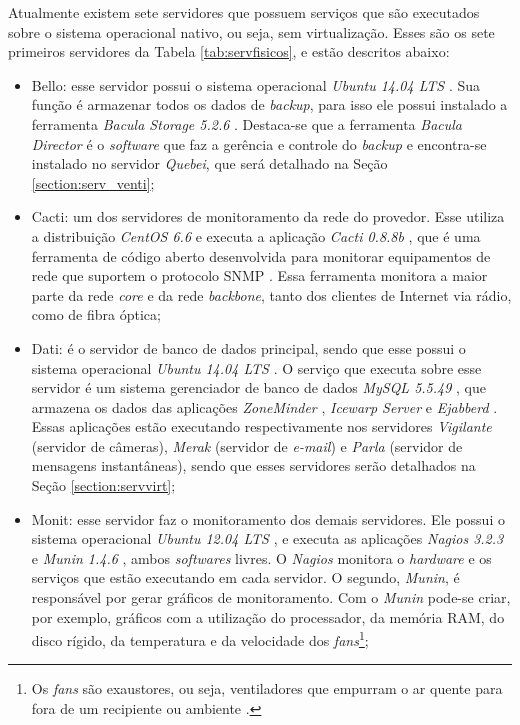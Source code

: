 Atualmente existem sete servidores que possuem serviços que são executados sobre o sistema operacional nativo, ou seja, sem virtualização. 
Esses são os sete primeiros servidores da Tabela \ref{tab:servfisicos}, e estão descritos abaixo:
\begin{itemize}
 \item Bello: esse servidor possui o sistema operacional \textit{Ubuntu 14.04 \ac{LTS}} \cite{ubuntu}. Sua função é armazenar todos os 
 dados de \textit{backup}, para isso ele possui instalado a ferramenta \textit{Bacula Storage 5.2.6} \cite{bacula}. Destaca-se que a ferramenta 
 \textit{Bacula Director} é o \textit{software} que faz a gerência e controle do \textit{backup} e encontra-se instalado no servidor 
 \textit{Quebei}, que será detalhado na Seção \ref{section:serv_venti};
 
 \item Cacti: um dos servidores de monitoramento da rede do provedor. Esse utiliza a distribuição \textit{CentOS 6.6} \cite{centos} e executa a 
 aplicação \textit{Cacti 0.8.8b} \cite{cacti}, que é uma ferramenta de código aberto desenvolvida para monitorar equipamentos de rede que 
 suportem o protocolo \ac{SNMP} \cite{kurose2006}. Essa ferramenta monitora a maior parte da rede \textit{core} e da rede \textit{backbone}, 
 tanto dos clientes de Internet via rádio, como de fibra óptica;
 
 \item Dati: é o servidor de banco de dados principal, sendo que esse possui o sistema operacional \textit{Ubuntu 14.04 \ac{LTS}} \cite{ubuntu}. 
 O serviço que executa sobre esse servidor é um sistema gerenciador de banco de dados \textit{MySQL 5.5.49} \cite{mysql}, que armazena os dados 
 das aplicações \textit{ZoneMinder} \cite{zoneminder}, \textit{Icewarp Server} \cite{icewarp} e \textit{Ejabberd} \cite{ejabberd}. Essas aplicações
 estão executando respectivamente nos servidores \textit{Vigilante} (servidor de câmeras), \textit{Merak} (servidor de \textit{e-mail}) e 
 \textit{Parla} (servidor de mensagens instantâneas), sendo que esses servidores serão detalhados na Seção \ref{section:servvirt};
 
 \item Monit: esse servidor faz o monitoramento dos demais servidores. Ele possui o sistema operacional \textit{Ubuntu 12.04 \ac{LTS}} 
 \cite{ubuntu}, e executa as aplicações \textit{Nagios 3.2.3} \cite{nagios} e \textit{Munin 1.4.6} \cite{munin}, ambos \textit{softwares} livres. 
 O \textit{Nagios} monitora o \textit{hardware} e os serviços que estão executando em cada servidor. O segundo, \textit{Munin}, é responsável por 
 gerar gráficos de monitoramento. Com o \textit{Munin} pode-se criar, por exemplo, gráficos com a utilização do processador, da memória \ac{RAM}, 
 do disco rígido, da temperatura e da velocidade dos \textit{fans}\footnote[1]{Os \textit{fans} são exaustores, ou seja, ventiladores que empurram
 o ar quente para fora de um recipiente ou ambiente \cite{ats2012}.};
 

\end{itemize}
